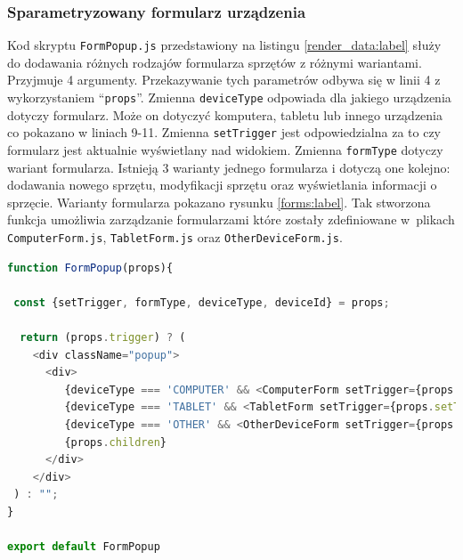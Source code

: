 \subsubsection{Sparametryzowany formularz urządzenia}
Kod skryptu \texttt{FormPopup.js} przedstawiony na listingu \ref{render_data:label} służy do dodawania różnych rodzajów formularza sprzętów z różnymi wariantami. Przyjmuje 4 argumenty. Przekazywanie tych parametrów odbywa się w linii 4 z wykorzystaniem "`\texttt{props}"'. Zmienna \texttt{deviceType} odpowiada dla jakiego urządzenia dotyczy formularz. Może on dotyczyć komputera, tabletu lub innego urządzenia co pokazano w liniach 9-11. Zmienna \texttt{setTrigger} jest odpowiedzialna za to czy formularz jest aktualnie wyświetlany nad widokiem. Zmienna \texttt{formType} dotyczy wariant formularza. Istnieją 3 warianty jednego formularza i dotyczą one kolejno: dodawania nowego sprzętu, modyfikacji sprzętu oraz wyświetlania informacji o sprzęcie. Warianty formularza pokazano rysunku \ref{forms:label}. Tak stworzona funkcja umożliwia zarządzanie formularzami które zostały zdefiniowane w~plikach \texttt{ComputerForm.js}, \texttt{TabletForm.js} oraz \texttt{OtherDeviceForm.js}.
\begin{lstlisting}[language=JavaScript, style=JavaScriptStyle,  caption={Obsługa formularzy}, label={render_data:label}]
function FormPopup(props){
    
 const {setTrigger, formType, deviceType, deviceId} = props;
    
  return (props.trigger) ? (
    <div className="popup">
      <div>
         {deviceType === 'COMPUTER' && <ComputerForm setTrigger={props.setTrigger} formType={formType} deviceId={deviceId}/>}
         {deviceType === 'TABLET' && <TabletForm setTrigger={props.setTrigger} formType={formType} deviceId={deviceId}/>}
         {deviceType === 'OTHER' && <OtherDeviceForm setTrigger={props.setTrigger}  formType={formType} deviceId={deviceId} />}
         {props.children}
      </div>
    </div>
 ) : "";
}

export default FormPopup
\end{lstlisting}


